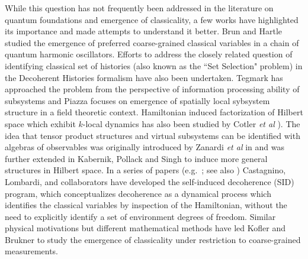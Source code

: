 \documentclass[aps,pra,onecolumn,nofootinbib,notitlepage,11pt,tightenlines]{revtex4-1}
\begin{document}
While this question has not frequently been addressed in the literature on quantum foundations and emergence of classicality, 
a few works have highlighted its importance and made attempts to understand it better. Brun and Hartle \cite{brun1999classical} studied 
the emergence of preferred coarse-grained classical variables in a chain of quantum harmonic oscillators. Efforts to address the closely related 
question of identifying classical set of histories (also known as the ``Set Selection" problem) in the Decoherent Histories 
formalism \cite{gell2019alternative,dowker1996consistent,kent1998quantum,riedel2012,Griffiths:1984rx,paz1993environment} have also been undertaken.
 Tegmark \cite{tegmark2015consciousness} has approached the problem from the perspective of information processing ability of subsystems and
 Piazza \cite{Piazza:2005wm} focuses on emergence of spatially local sybsystem structure in a field theoretic context. 
Hamiltonian induced factorization of Hilbert space which exhibit $k$-local dynamics has also been studied by Cotler
 \emph{et al} \cite{cotler2019locality}). The idea that tensor product structures and virtual subsystems can be identified with algebras
 of observables was originally introduced by Zanardi \emph{et al} in \cite{Zanardi:2001zz,Zanardi:2004zz} and was further extended in
 Kabernik, Pollack and Singh \cite{Kabernik:2019jko} to induce more general structures in Hilbert space. In a series of papers
 (e.g.\ \cite{2004SHPMP..35...73C,Castagnino:2008zz,10.1007/978-94-007-2404-4_15,2014BrJPh..44..138F}; see also \cite{2005PhRvA..72a2109S})
 Castagnino, Lombardi, and collaborators have developed the self-induced decoherence (SID) program, which conceptualizes decoherence as a
 dynamical process which identifies the classical variables by inspection of the Hamiltonian, without the need to explicitly identify a
 set of environment degrees of freedom. Similar physical motivations but different mathematical methods have led Kofler and 
Brukner \cite{2007PhRvL..99r0403K} to study the emergence of classicality under restriction to coarse-grained measurements.
\end{document}
